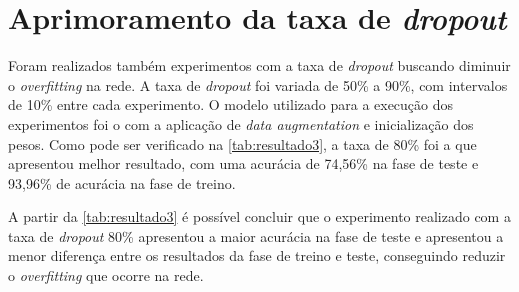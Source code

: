 \section{Aprimoramento da taxa de \textit{dropout}}
Foram realizados também experimentos com a taxa de \textit{dropout} buscando diminuir o \textit{overfitting} na rede. A taxa de \textit{dropout} foi variada de 50\% a 90\%, com intervalos de 10\% entre cada experimento. O modelo utilizado para a execução dos experimentos foi o com a aplicação de \textit{data augmentation} e inicialização dos pesos. Como pode ser verificado na \autoref{tab:resultado3}, a taxa de 80\% foi a que apresentou melhor resultado, com uma acurácia de 74,56\% na fase de teste e 93,96\% de acurácia na fase de treino.



\par A partir da \autoref{tab:resultado3} é possível concluir que o experimento realizado com a taxa de \textit{dropout} 80\% apresentou a maior acurácia na fase de teste e apresentou a menor diferença entre os resultados da fase de treino e teste, conseguindo reduzir o \textit{overfitting} que ocorre na rede. 

